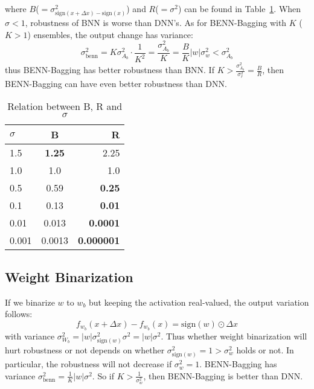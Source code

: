 \documentclass[10pt,twocolumn,letterpaper]{article}
\begin{document}
where $B$($=\sigma_{\text{sign}(x+\Delta x)-\text{sign}(x)}^{2}$) and $R$($=\sigma^{2}$) can be found in Table~\ref{table:opt_osc_1}. When $\sigma<1$, robustness of BNN is worse than DNN's. As for BENN-Bagging with $K$ ($K>1$) ensembles, the output change has variance:
\[
    \sigma_{\text{benn}}^{2} = K\sigma_{A_{b}}^{2} \cdot \frac{1}{K^{2}} = \frac{\sigma_{A_{b}}^{2}}{K} = \frac{B}{K}|w|\sigma_{w}^{2} < \sigma_{A_{b}}^{2}
\]
thus BENN-Bagging has better robustness than BNN. If $K > \frac{\sigma_{A_{b}}^{2}}{\sigma_{r}^{2}} = \frac{B}{R}$, then BENN-Bagging can have even better robustness than DNN.
\begin{table}
    \caption{Relation between B, R and $\sigma$}
        \centering
        \scriptsize
        \begin{tabular}{lcr}
            \toprule
            \toprule
            $\sigma$ & B & R  \\
            \midrule
            1.5 & \textbf{1.25} & 2.25 \\
            \hline
            1.0 & 1.0 & 1.0 \\
            \hline
            0.5 & 0.59 & \textbf{0.25} \\
            \hline
            0.1 & 0.13 & \textbf{0.01} \\
            \hline
            0.01 & 0.013 & \textbf{0.0001} \\
            \hline
            0.001 & 0.0013 & \textbf{0.000001} \\
            \hline
            \bottomrule
        \end{tabular}
        \label{table:opt_osc_1}
\end{table}
\subsection{Weight Binarization}
\label{sec:wb}
If we binarize $w$ to $w_{b}$ but keeping the activation real-valued, the output variation follows:
\[
    f_{w_{b}}(x+\Delta x) - f_{w_{b}}(x) = \text{sign}(w) \odot \Delta x
\]
with variance $\sigma_{W_{b}}^{2} =  |w|\sigma_{\text{sign}(w)}^{2}\sigma^{2} = |w|\sigma^{2}$. Thus whether weight binarization will hurt robustness or not depends on whether $\sigma_{\text{sign}(w)}^{2} = 1 > \sigma_{w}^{2}$ holds or not. In particular, the robustness will not decrease if $\sigma_{w}^{2} = 1$. BENN-Bagging has variance $\sigma_{\text{benn}}^{2} = \frac{1}{K}|w|\sigma^{2}$. So if $K > \frac{1}{\sigma_{w}^{2}}$, then BENN-Bagging is better than DNN.
\end{document}
